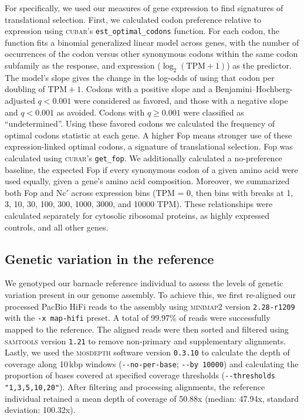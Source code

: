 For \bgla{} specifically, we used our measures of gene expression to find signatures of
translational selection.
First, we calculated codon preference relative to expression using \textsc{cubar}'s
\texttt{est\_optimal\_codons} function.
For each codon, the function fits a binomial generalized linear model across genes, with
the number of occurrences of the codon versus other synonymous codons within the same codon
subfamily as the response, and expression ($\log_{2}(\text{TPM}+1)$) as the predictor.
The model's slope gives the change in the log-odds of using that codon per doubling of
$\text{TPM} + 1$.
Codons with a positive slope and a Benjamini--Hochberg-adjusted $q < 0.001$ were considered
as favored, and those with a negative slope and $q < 0.001$ as avoided.
Codons with $q \geq 0.001$ were classified as ``undetermined''.
Using these favored codons we calculated the frequency of optimal codons statistic
\citep[Fop;][]{ikemura_1981_codons} at each gene.
A higher Fop means stronger use of these expression-linked optimal codons, a signature
of translational selection.
Fop was calculated using \textsc{cubar}'s \texttt{get\_fop}.
We additionally calculated a no-preference baseline, the expected Fop if every synonymous
codon of a given amino acid were used equally, given a gene's amino acid composition.
Moreover, we summarized both Fop and Nc$'$ across expression bins (TPM = 0, then bins with
breaks at 1, 3, 10, 30, 100, 300, \num{1000}, \num{3000}, and \num{10000} TPM).
These relationships were calculated separately for cytosolic ribosomal proteins, as highly
expressed controls, and all other genes.

\subsection*{Genetic variation in the \balgla{} reference}\label{sec:methods_ref_geno}

We genotyped our barnacle reference individual to assess the levels of genetic variation
present in our genome assembly.
To achieve this, we first re-aligned our processed PacBio HiFi reads to the assembly using
\textsc{minimap2} version \texttt{2.28-r1209} with the \texttt{-x map-hifi} preset.
A total of 99.97\% of reads were successfully mapped to the reference.
The aligned reads were then sorted and filtered using \textsc{samtools} version \texttt{1.21}
to remove non-primary and supplementary alignments.
Lastly, we used the \textsc{mosdepth} software version \texttt{0.3.10}
\citep{pedersen_mosdepth_2018} to calculate the depth of coverage along 10\,kbp windows
(\texttt{-{}-no-per-base}; \texttt{-{}-by 10000}) and calculating the proportion of bases
covered at specified coverage thresholds (\texttt{-{}-thresholds "1,3,5,10,20"}).
After filtering and processing alignments, the reference individual retained a mean
depth of coverage of 50.88x (median: 47.94x, standard deviation: 100.32x).
\vspace{0.1cm}

